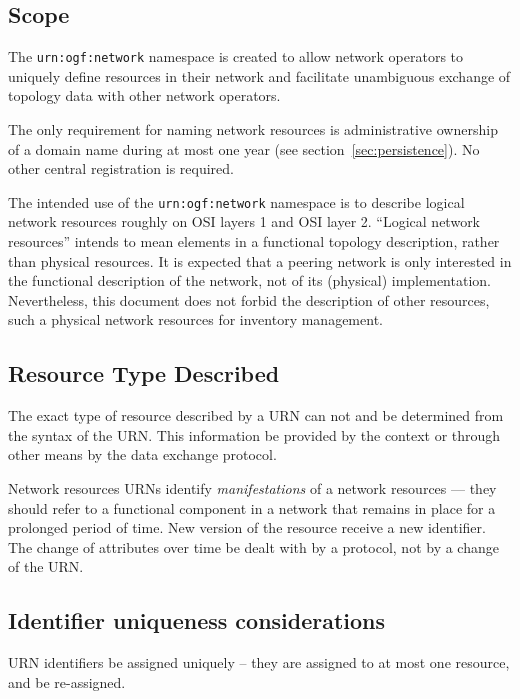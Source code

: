 \documentclass[12pt]{article}  %
\begin{document}
\subsection{Scope}

The \texttt{urn:ogf:network} namespace is created to allow network 
operators to uniquely define resources in their network and facilitate 
unambiguous exchange of topology data with other network operators.

The only requirement for naming network resources is administrative 
ownership of a domain name during at most one year (see section~\ref{sec:persistence}). 
No other central registration is required.

The intended use of the \texttt{urn:ogf:network} namespace is to describe 
logical network resources roughly on OSI layers 1 and OSI layer 2. 
“Logical network resources” intends to mean elements in a functional topology 
description, rather than physical resources. It is expected that a peering 
network is only interested in the functional description of the network, 
not of its (physical) implementation. Nevertheless, this document does 
not forbid the description of other resources, such a physical network 
resources for inventory management.

\subsection{Resource Type Described}

The exact type of resource described by a URN can not and \MUSTNOT{} be 
determined from the syntax of the URN. This information \MUST{} be provided 
by the context or through other means by the data exchange protocol.

Network resources URNs \SHOULD{} identify \emph{manifestations} of a 
network resources --- they should refer to a functional component in a 
network that remains in place for a prolonged period of time. 
New version of the resource \SHOULDNOT{} receive a new identifier.
The change of attributes over time \SHOULD{} be dealt with by a protocol, 
not by a change of the URN.

\subsection{Identifier uniqueness considerations}

URN identifiers \MUST{} be assigned uniquely -- they are assigned to 
at most one resource, and \MUSTNOT{} be re-assigned.
\end{document}
